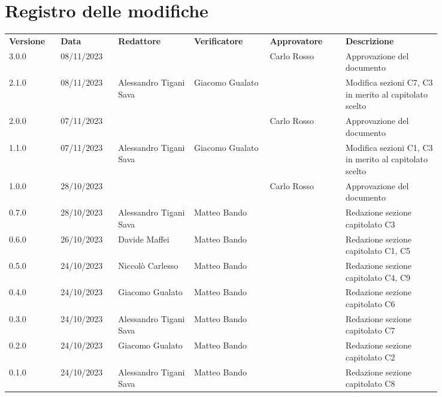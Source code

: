\section*{Registro delle modifiche}
{
\renewcommand{\arraystretch}{1.5}
\scriptsize
\begin{tabular}{p{0.10\linewidth}p{0.10\linewidth}p{0.15\linewidth}p{0.15\linewidth}p{0.15\linewidth}p{0.19\linewidth}}
    \textbf{Versione}   & \textbf{Data} & \textbf{Redattore}     & \textbf{Verificatore} & \textbf{Approvatore}  & \textbf{Descrizione}  \\
    3.0.0   & 08/11/2023    &						 &	                & Carlo Rosso & Approvazione del documento   \\
    \hline
    2.1.0   & 08/11/2023    & Alessandro Tigani Sava & Giacomo Gualato  &   & Modifica sezioni C7, C3 in merito al capitolato scelto \\
    \hline
    2.0.0   & 07/11/2023    &						 &	                & Carlo Rosso & Approvazione del documento   \\
    \hline
    1.1.0   & 07/11/2023    & Alessandro Tigani Sava & Giacomo Gualato  &   & Modifica sezioni C1, C3 in merito al capitolato scelto \\
    \hline
    1.0.0   & 28/10/2023    &						 &	                & Carlo Rosso & Approvazione del documento   \\
    \hline
    0.7.0   & 28/10/2023    & Alessandro Tigani Sava & Matteo Bando	    &   & Redazione sezione capitolato C3   \\
    \hline
    0.6.0   & 26/10/2023    & Davide Maffei          & Matteo Bando     &   & Redazione sezione capitolato C1, C5   \\   
    \hline 
    0.5.0   & 24/10/2023    & Niccolò Carlesso       & Matteo Bando     &   & Redazione sezione capitolato C4, C9  	\\
    \hline
    0.4.0   & 24/10/2023    & Giacomo Gualato        & Matteo Bando     &   & Redazione sezione capitolato C6  	\\
    \hline
    0.3.0   & 24/10/2023    & Alessandro Tigani Sava & Matteo Bando     &   & Redazione sezione capitolato C7   \\
    \hline
    0.2.0   & 24/10/2023    & Giacomo Gualato        & Matteo Bando     &   & Redazione sezione capitolato C2   \\
    \hline
    0.1.0   & 24/10/2023    & Alessandro Tigani Sava & Matteo Bando	    &   & Redazione sezione capitolato C8   \\    
    \hline
\end{tabular}
}
